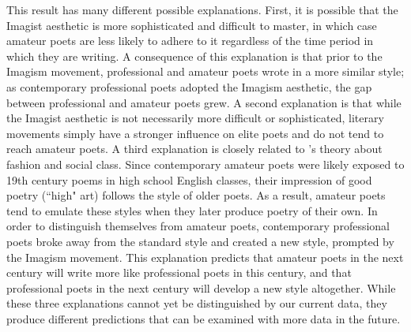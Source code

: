 \documentclass{book}
\begin{document}
This result has many different possible explanations. First, it is possible that the Imagist aesthetic is more sophisticated and difficult to master, in which case amateur poets are less likely to adhere to it regardless of the time period in which they are writing. A consequence of this explanation is that prior to the Imagism movement, professional and amateur poets wrote in a more similar style; as contemporary professional poets adopted the Imagism aesthetic, the gap between professional and amateur poets grew. A second explanation is that while the Imagist aesthetic is not necessarily more difficult or sophisticated, literary movements simply have a stronger influence on elite poets and do not tend to reach amateur poets. A third explanation is closely related to \citep{simmel1957fashion}'s theory about fashion and social class. Since contemporary amateur poets were likely exposed to 19th century poems in high school English classes, their impression of good poetry (``high" art) follows the style of older poets. As a result, amateur poets tend to emulate these styles when they later produce poetry of their own. In order to distinguish themselves from amateur poets, contemporary professional poets broke away from the standard style and created a new style, prompted by the Imagism movement. This explanation predicts that amateur poets in the next century will write more like professional poets in this century, and that professional poets in the next century will develop a new style altogether. While these three explanations cannot yet be distinguished by our current data, they produce different predictions that can be examined with more data in the future. 
\end{document}
